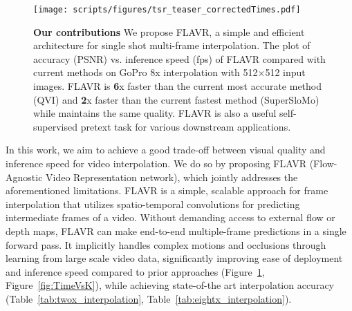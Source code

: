 \documentclass[10pt,twocolumn,letterpaper]{article}
\newcommand{\figref}[1]{Figure~\ref{#1}}
\newcommand{\tabref}[1]{Table~\ref{#1}}
\newcommand{\Ours}{FLAVR}
\begin{document}
\begin{figure}
    \begin{center}
    \texttt{[image: scripts/figures/tsr\_teaser\_correctedTimes.pdf]}
    \end{center}
    \vspace{-16pt}
    \caption{{\bf Our contributions} We propose FLAVR, a simple and efficient architecture for single shot multi-frame interpolation. The plot of accuracy (PSNR) vs. inference speed (fps) of FLAVR compared with current methods on GoPro 8x interpolation with 512$\times$512 input images. FLAVR is {\bf 6}x faster than the current most accurate method (QVI) and {\bf 2}x faster than the current fastest method (SuperSloMo) while maintains the same quality. FLAVR is also a useful self-supervised pretext task for various downstream applications.
    }
    \vspace{-12pt}
    \label{fig:intro_pic}
\end{figure}


In this work, we aim to achieve a good trade-off between visual quality and inference speed for video interpolation. We do so by proposing \Ours{} (Flow-Agnostic Video Representation network), which jointly addresses the aforementioned limitations. \Ours{} is a simple, scalable approach for frame interpolation that utilizes spatio-temporal convolutions for predicting intermediate frames of a video. Without demanding access to external flow or depth maps, \Ours{} can make end-to-end multiple-frame predictions in a single forward pass. It implicitly handles complex motions and occlusions through learning from large scale video data, significantly improving ease of deployment and inference speed compared to prior approaches (\figref{fig:intro_pic}, \figref{fig:TimeVsK}), while achieving state-of-the art interpolation accuracy (\tabref{tab:twox_interpolation}, \tabref{tab:eightx_interpolation}).  
\end{document}
